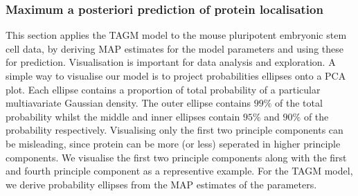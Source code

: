\documentclass[12pt,english]{article}
\begin{document}
\subsubsection{Maximum a posteriori prediction of protein localisation}
This section applies the TAGM model to the mouse pluripotent embryonic
stem cell data, by deriving MAP estimates for the model parameters and
using these for prediction.  Visualisation is important for data
analysis and exploration. A simple way to visualise our model is to
project probabilities ellipses onto a PCA plot. Each ellipse contains
a proportion of total probability of a particular multiavariate
Gaussian density.  The outer ellipse contains $99\%$ of the total
probability whilst the middle and inner ellipses contain $95\%$ and
$90\%$ of the probability respectively. Visualising only the first two
principle components can be misleading, since protein can be more (or
less) seperated in higher principle components.  We visualise the
first two principle components along with the first and fourth
principle component as a representive example. For the TAGM model, we
derive probability ellipses from the MAP estimates of the parameters.
\end{document}
